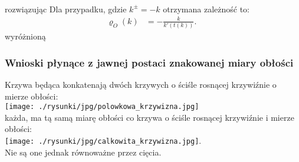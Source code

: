 \documentclass[a4paper, 12pt, twosided]{article}
\newcommand{\smalltodoII}[1]{\hfill \break \textbf{\ \textcolor{violet}{To do: #1}}\hfill \break}
\newcommand{\rysunek}[1]{\hfill \break\\[16pt] \Huge \textbf{\textcolor{violet}{Brakujący rysunek 
\normalsize
#1}} \hfill
\break \\[16pt] \normalsize}
\begin{document}
\\
 rozwiązując 
Dla przypadku, gdzie $k^\pm = -k$ otrzymana zależność to:
\begin{align}
    \varrho_O(k) &= -\frac{k}{k'(t(k))}.\ \
\end{align}
 wyróżnioną 
\subsubsection{Wnioski płynące z jawnej postaci znakowanej miary obłości}
Krzywa będąca konkatenają dwóch krzywych o ściśle rosnącej krzywiźnie o mierze obłości: \\
\texttt{[image: ./rysunki/jpg/polowkowa\_krzywizna.jpg]} \\
każda, ma tą samą miarę obłości co krzywa o ściśle rosnącej krzywiźnie i mierze obłości: \\
\texttt{[image: ./rysunki/jpg/calkowita\_krzywizna.jpg]}. \\
Nie są one jednak równoważne przez cięcia. 
 
\end{document}
